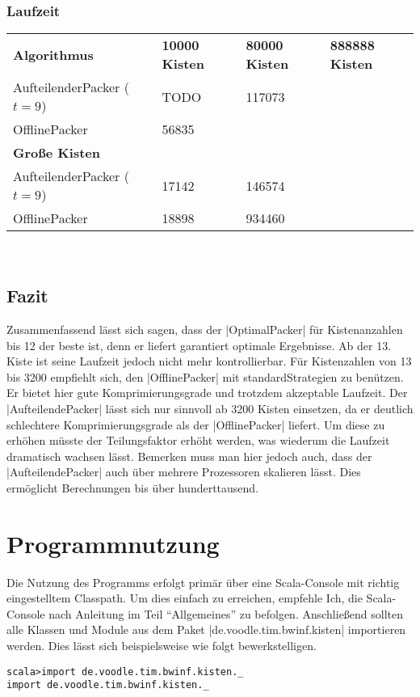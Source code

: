 \subsubsection*{Laufzeit}
\begin{tabular}{llll}
\textbf{Algorithmus} 	& \textbf{10000 Kisten} & \textbf{80000 Kisten} & \textbf{888888 Kisten} \\
 AufteilenderPacker ($t=9$)  	& TODO		& 117073		& 			 \\
 OfflinePacker			& 56835		& 			& 		\vspace*{.48em} \\
\textbf{Große Kisten} & & & \\
 AufteilenderPacker ($t=9$)  	& 17142		& 146574		& 			\\
 OfflinePacker			& 18898		& 934460		& 			\\
\end{tabular} \\

\subsection{Fazit}
Zusammenfassend lässt sich sagen, dass der |OptimalPacker| für Kistenanzahlen bis 12 der beste ist, denn er liefert garantiert optimale Ergebnisse.
Ab der 13. Kiste ist seine Laufzeit jedoch nicht mehr kontrollierbar.
Für Kistenzahlen von 13 bis 3200 empfiehlt sich, den |OfflinePacker| mit standardStrategien zu benützen.
Er bietet hier gute Komprimierungsgrade und trotzdem akzeptable Laufzeit.
Der |AufteilendePacker| lässt sich nur sinnvoll ab 3200 Kisten einsetzen, da er deutlich schlechtere Komprimierungsgrade als der |OfflinePacker| liefert.
Um diese zu erhöhen müsste der Teilungsfaktor erhöht werden, was wiederum die Laufzeit dramatisch wachsen lässt.
Bemerken muss man hier jedoch auch, dass der |AufteilendePacker| auch über mehrere Prozessoren skalieren lässt.
Dies ermöglicht Berechnungen bis über hunderttausend.

\newpage
\section{Programmnutzung}
\lstset{basicstyle=\ttfamily}
Die Nutzung des Programms erfolgt primär über eine Scala-Console mit richtig eingestelltem Classpath.
Um dies einfach zu erreichen, empfehle Ich, die Scala-Console nach Anleitung im Teil ``Allgemeines'' zu befolgen.
Anschließend sollten alle Klassen und Module aus dem Paket |de.voodle.tim.bwinf.kisten| importieren werden.
Dies lässt sich beispielsweise wie folgt bewerkstelligen.
\begin{lstlisting}
scala>import de.voodle.tim.bwinf.kisten._
import de.voodle.tim.bwinf.kisten._

\end{lstlisting}
